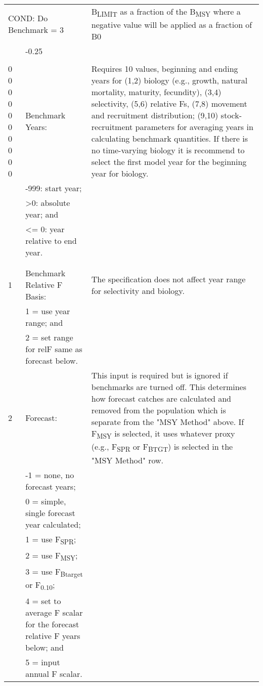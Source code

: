\begin{landscape}
{\begin{longtable}{p{3.2cm} p{7cm} p{10.8cm}}
 \hline 
 \multicolumn{2}{l}{COND: Do Benchmark = 3} &  \multirow{1}{1cm}[-0.1cm]{\parbox{11cm}{B\textsubscript{LIMIT} as a fraction of the B\textsubscript{MSY} where a negative value will be applied as a fraction of B0}}\Tstrut\\
     & -0.25 &  \\
     &       & \Bstrut\\
  
  
 \hline
 0 0 0 0 0 0 0 0 0 0 & Benchmark Years: & \multirow{1}{1cm}[-0.25cm]{\parbox{11cm }{ Requires 10 values, beginning and ending years for (1,2) biology (e.g., growth, natural mortality, maturity, fecundity), (3,4) selectivity, (5,6) relative Fs, (7,8) movement and recruitment distribution; (9,10) stock-recruitment parameters for averaging years in calculating benchmark quantities. If there is no time-varying biology it is recommend to select the first model year for the beginning year for biology.}} \Tstrut\\
  & -999: start year; & \\
  & >0:   absolute year; and & \\
  & <= 0: year relative to end year. & \\
  & & \Bstrut\\
  & & \Bstrut\\

  1 & Benchmark Relative F Basis: &  \multirow{1}{1cm}[-0.25cm]{\parbox{11cm }{ The specification does not affect year range for selectivity and biology.}} \Tstrut\\
    & 1 = use year range; and & \\
    & 2 = set range for relF same as forecast below. & \\
    
  \hline
  2 & Forecast: & \multirow{1}{1cm}[-0.25cm]{\parbox{11cm }{ This input is required but is ignored if benchmarks are turned off.  This determines how forecast catches are calculated and removed from the population which is separate from the "MSY Method" above. If F\textsubscript{MSY} is selected, it uses whatever proxy (e.g., F\textsubscript{SPR} or F\textsubscript{BTGT}) is selected in the "MSY Method" row.}} \Tstrut\\
    & -1 = none, no forecast years; & \\
    & 0 = simple, single forecast year calculated; & \\
    & 1 = use F\textsubscript{SPR}; & \\
    & 2 = use F\textsubscript{MSY}; & \\
    & 3 = use F\textsubscript{Btarget} or F\textsubscript{0.10}; & \\
    & 4 = set to average F scalar for the forecast relative F years below; and & \\
    & 5 = input annual F scalar. & \Bstrut\\
    

\end{longtable}}
\end{landscape}
